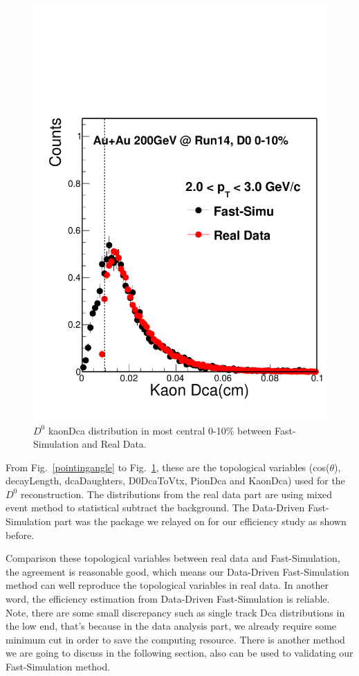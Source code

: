 \begin{figure}[htbp]
\begin{minipage}[htbp]{0.52\linewidth}
\includegraphics[width=1.0\textwidth,angle=0]{figure/Run14_D0HFT/kaonDca.pdf} 
\caption{ $D^0$ kaonDca distribution in most central 0-10\% between Fast-Simulation and Real Data. \label{kaonDca}}
\end{minipage}
\end{figure}

From Fig.~\ref{pointingangle} to Fig.~\ref{kaonDca}, these are the topological variables (cos($\theta$), decayLength, dcaDaughters, D0DcaToVtx, PionDca and KaonDca) used for the $D^0$ reconstruction. The distributions from the real data part are using mixed event method to statistical subtract the background. The Data-Driven Fast-Simulation part was the package we relayed on for our efficiency study as shown before.

Comparison these topological variables between real data and Fast-Simulation, the agreement is reasonable good, which means our Data-Driven Fast-Simulation method can well reproduce the topological variables in real data. In another word, the efficiency estimation from Data-Driven Fast-Simulation is reliable. Note, there are some small discrepancy such as single track Dca distributions in the low end, that's because in the data analysis part, we already require some minimum cut in order to save the computing resource. There is another method we are going to discuss in the following section, also can be used to validating our Fast-Simulation method.

